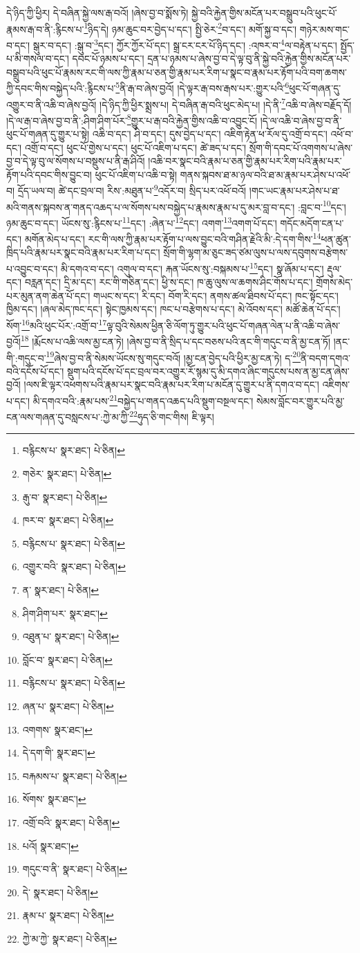 དེ་ཉིད་ཀྱི་ཕྱིར། དེ་བཞིན་སྐྱེ་ལས་རྒ་བའོ། །ཞེས་བྱ་བ་སྨོས་ཏེ། སྐྱེ་བའི་རྐྱེན་གྱིས་མངོན་པར་བསྒྲུབ་པའི་ཕུང་པོ་རྣམས་རྒ་བ་ནི་:རྙིངས་པ་\footnote{བརྙིངས་པ་  སྣར་ཐང་།  པེ་ཅིན། }ཉིད་དེ། ཉམ་ཆུང་བར་བྱེད་པ་དང་། སྤྱི་ཅེར་\footnote{གཅེར་  སྣར་ཐང་།  པེ་ཅིན། }བ་དང་། མགོ་སྐྱ་བ་དང་། གཉེར་མས་གང་བ་དང་། སྒུར་བ་དང་། :སྒུ་བ་\footnote{རྒུ་བ་  སྣར་ཐང་།  པེ་ཅིན། }དང་། ཀྱོར་ཀྱོར་པོ་དང་། སྒྲ་ངར་ངར་པོ་ཉིད་དང་། :འཁར་བ་\footnote{ཁར་བ་  སྣར་ཐང་།  པེ་ཅིན། }ལ་བརྟེན་པ་དང་། སྤྱོད་པ་མི་གསལ་བ་དང་། དབང་པོ་ཉམས་པ་དང་། དྲན་པ་ཉམས་པ་ཞེས་བྱ་བ་དེ་ལྟ་བུ་ནི་སྐྱེ་བའི་རྐྱེན་གྱིས་མངོན་པར་བསྒྲུབ་པའི་ཕུང་པོ་རྣམས་རང་གི་ལས་ཀྱི་རྣམ་པ་ཅན་གྱི་རྣམ་པར་རིག་པ་སྣང་བ་རྣམ་པར་རྟོག་པའི་བག་ཆགས་ཀྱི་དབང་གིས་བསྐྱེད་པའི་:རྙིངས་པ་\footnote{བརྙིངས་པ་  སྣར་ཐང་།  པེ་ཅིན། }ནི་རྒ་བ་ཞེས་བྱའོ། །དེ་ལྟར་རྒ་བས་རྒས་པར་:གྱུར་པའི་\footnote{འགྱུར་བའི་  སྣར་ཐང་།  པེ་ཅིན། }ཕུང་པོ་གཞན་དུ་འགྱུར་བ་ནི་འཆི་བ་ཞེས་བྱའོ། །དེ་ཉིད་ཀྱི་ཕྱིར་སྨྲས་པ། དེ་བཞིན་རྒ་བའི་ཕུང་མེད་པ། །དེ་ནི་\footnote{ན་  སྣར་ཐང་།  པེ་ཅིན། }འཆི་བ་ཞེས་བརྗོད་དོ། །དེ་ལ་རྒ་བ་ཞེས་བྱ་བ་ནི་:ཤིག་ཤིག་པོར་\footnote{ཤིག་ཤིག་པར་  སྣར་ཐང་། }གྱུར་པ་རྒ་བའི་རྐྱེན་གྱིས་འཆི་བ་འབྱུང་ངོ། །དེ་ལ་འཆི་བ་ཞེས་བྱ་བ་ནི་ཕུང་པོ་གཞན་དུ་གྱུར་པ་སྟེ། འཆི་བ་དང་། ཤི་བ་དང་། དུས་བྱེད་པ་དང་། འཇིག་རྟེན་ཕ་རོལ་དུ་འགྲོ་བ་དང་། འཕོ་བ་དང་། འགྲོ་བ་དང་། ཕུང་པོ་གྱེས་པ་དང་། ཕུང་པོ་འཇིག་པ་དང་། ཚེ་ཟད་པ་དང་། སྲོག་གི་དབང་པོ་འགགས་པ་ཞེས་བྱ་བ་དེ་ལྟ་བུ་ལ་སོགས་པ་བསྡུས་པ་ནི་རྒ་ཤིའོ། །འཆི་བར་སྣང་བའི་རྣམ་པ་ཅན་གྱི་རྣམ་པར་རིག་པའི་རྣམ་པར་རྟོག་པའི་དབང་གིས་བྱུང་བ། ཕུང་པོ་འཇིག་པ་འཆི་བ་སྟེ། གནས་སྐབས་ཐ་མ་ཉལ་བའི་ཐ་མ་རྣམ་པར་ཤེས་པ་འཕོ་བ། དྲོད་ཡལ་བ། ཚེ་དང་བྲལ་བ། རིས་:མཐུན་པ་\footnote{འཐུན་པ་  སྣར་ཐང་།  པེ་ཅིན། }འདོར་བ། སྲིད་པར་འཕོ་བའོ། །གང་ཡང་རྣམ་པར་ཤེས་པ་ཐ་མའི་གནས་སྐབས་ན་གནད་འཆད་པ་ལ་སོགས་པས་བསྐྱེད་པ་རྣམས་རྣམ་པ་དུ་མར་བླ་བ་དང་། :བླང་བ་\footnote{བློང་བ་  སྣར་ཐང་།  པེ་ཅིན། }དང་། ཉམ་ཆུང་བ་དང་། ཡོངས་སུ་:རྙིངས་པ་\footnote{བརྙིངས་པ་  སྣར་ཐང་།  པེ་ཅིན། }དང་། :ཞེན་པ་\footnote{ཞན་པ་  སྣར་ཐང་།  པེ་ཅིན། }དང་། འགག་\footnote{འགགས་  སྣར་ཐང་། }འགག་པོ་དང་། གདོང་མདོག་ངན་པ་དང་། མགོན་མེད་པ་དང་། རང་གི་ལས་ཀྱི་རྣམ་པར་རྟོག་པ་ལས་བྱུང་བའི་གཤིན་རྗེའི་མི་:དེ་དག་གིས་\footnote{དེ་དག་གི་  སྣར་ཐང་། }ཕན་ཚུན་ཁྲིད་པའི་རྣམ་པར་སྣང་བའི་རྣམ་པར་རིག་པ་དང་། སྲོག་གི་ལྷག་མ་ཅུང་ཟད་ཙམ་ལུས་པ་ལས་དབུགས་བརྩེགས་པ་འབྱུང་བ་དང་། མི་དགའ་བ་དང་། འགུལ་བ་དང་། རྐན་ཡོངས་སུ་:བསྐམས་པ་\footnote{བརྐམས་པ་  སྣར་ཐང་།  པེ་ཅིན། }དང་། སྣ་ཞོམ་པ་དང་། རྡུལ་དང་། བརླན་དང་། དྲི་མ་དང་། རང་གི་གཅིན་དང་། ཕྱི་ས་དང་། ཁ་ཆུ་ལུས་ལ་ཆགས་ཤིང་གོས་པ་དང་། གྲོགས་མེད་པར་མུན་ནག་ཆེན་པོ་དང་། གཡང་ས་དང་། རི་དང་། བོག་རི་དང་། ནགས་ཚལ་ཐིབས་པོ་དང་། ཁང་སྟོང་དང་། ཁྱིམ་དང་། །ཞལ་མེད་ཁང་དང་། སྟེང་ཁྱམས་དང་། ཁང་པ་བརྩེགས་པ་དང་། མེ་འོབས་དང་། མཚོ་ཆེན་པོ་དང་། སོག་\footnote{སོགས་  སྣར་ཐང་། }མའི་ཕུང་པོར་:འགྲོ་བ་\footnote{འགྲོ་བའི་  སྣར་ཐང་།  པེ་ཅིན། }ལྟ་བུའི་སེམས་ཕྱིན་ཅི་ལོག་ཏུ་གྱུར་པའི་ཕུང་པོ་གཞན་ལེན་པ་ནི་འཆི་བ་ཞེས་བྱའོ།\footnote{པའོ།  སྣར་ཐང་། } །རྨོངས་པ་འཆི་ལས་མྱ་ངན་ཏེ། །ཞེས་བྱ་བ་ནི་སྲིད་པ་དང་བཅས་པའི་ནང་གི་གདུང་བ་ནི་མྱ་ངན་ཏོ། །ནང་གི་:གདུང་བ་\footnote{གདུང་བ་ནི་  སྣར་ཐང་།  པེ་ཅིན། }ཞེས་བྱ་བ་ནི་སེམས་ཡོངས་སུ་གདུང་བའོ། །མྱ་ངན་བྱེད་པའི་ཕྱིར་མྱ་ངན་ཏེ། ད་\footnote{དེ་  སྣར་ཐང་།  པེ་ཅིན། }ནི་བདག་དགའ་བའི་དངོས་པོ་དང་། སྡུག་པའི་དངོས་པོ་དང་བྲལ་བར་འགྱུར་རོ་སྙམ་དུ་མི་དགའ་ཞིང་གདུངས་པས་ན་མྱ་ངན་ཞེས་བྱའོ། །ལས་ཇི་ལྟར་འཕགས་པའི་རྣམ་པར་སྣང་བའི་རྣམ་པར་རིག་པ་མངོན་དུ་གྱུར་པ་ནི་དགའ་བ་དང་། འཇིགས་པ་དང་། མི་དགའ་བའི་:རྣམ་པས་\footnote{རྣམ་པ་  སྣར་ཐང་།  པེ་ཅིན། }བསྐྱེད་པ་གནད་འཆད་པའི་སྡུག་བསྔལ་དང་། སེམས་བློང་བར་གྱུར་པའི་མྱ་ངན་ལས་གཞན་དུ་བསླངས་པ་:ཀྱེ་མ་ཀྱི་\footnote{ཀྱེ་མ་ཀྱེ་  སྣར་ཐང་།  པེ་ཅིན། }ཧུད་ཅི་གང་གིས། ཇི་ལྟར། 